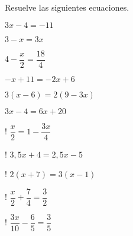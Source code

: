 \documentclass[sin nombre]{plantilla-evaluacion-v1}
\begin{document}
\begin{partes}
  \parte Resuelve las siguientes ecuaciones.
  \begin{ejercicios}
    \ejercicio $3x-4 = -11$
    \begin{malla}[height=4cm]
    \end{malla}
    \ejercicio $3-x=3x$
    \begin{malla}[height=4cm]
    \end{malla}
    \ejercicio $4-\dfrac{x}{2} = \dfrac{18}{4}$
    \begin{malla}[height=4cm]
    \end{malla}
    \ejercicio $-x+11=-2x+6$
    \begin{malla}[height=4cm]
    \end{malla}
    \ejercicio $3(x-6)=2(9-3x)$
    \begin{malla}[height=4cm]
    \end{malla}
    \ejercicio $3x-4 = 6x+20$
    \begin{malla}[height=4cm]
    \end{malla}
    \ejercicio! $\dfrac{x}{2}= 1 -\dfrac{3x}{4}$
    \begin{malla}[height=4cm]
    \end{malla}
    \ejercicio! $3,5x+4=2,5x-5$
    \begin{malla}[height=4cm]
    \end{malla}
    \ejercicio! $2(x+7)=3(x-1)$
    \begin{malla}[height=4cm]
    \end{malla}
    \ejercicio! $\dfrac{x}{2}+\dfrac{7}{4}=\dfrac{3}{2}$
    \begin{malla}[height=4cm]
    \end{malla}
    \ejercicio! $\dfrac{3x}{10}-\dfrac{6}{5}=\dfrac{3}{5}$
    \begin{malla}[height=4cm]
    \end{malla}
  \end{ejercicios}

\end{partes}
\end{document}

